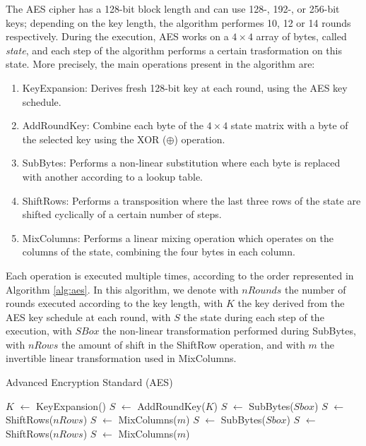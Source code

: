 \documentclass[12pt,a4paper]{book}
\theoremstyle{definition}
\begin{document}
	The AES cipher has a 128-bit block length and can use 128-, 192-, or 256-bit keys; depending on the key length, the algorithm performes 10, 12 or 14 rounds respectively. During the execution, AES works on a $4\times 4$ array of bytes, called \textit{state}, and each step of the algorithm performs a certain trasformation on this state. More precisely, the main operations present in the algorithm are:
	\begin{enumerate}
		\item \textsf{KeyExpansion}: Derives fresh 128-bit key at each round, using the AES key schedule.
		\item \textsf{AddRoundKey}: Combine each byte of the $4\times 4$ state matrix with a byte of the selected key using the XOR ($\oplus$) operation.
		\item \textsf{SubBytes}: Performs a non-linear substitution where each byte is replaced with another according to a lookup table.
		\item \textsf{ShiftRows}: Performs a transposition where the last three rows of the state are shifted cyclically of a certain number of steps.
		\item \textsf{MixColumns}: Performs a linear mixing operation which operates on the columns of the state, combining the four bytes in each column.
	\end{enumerate}
	Each operation is executed multiple times, according to the order represented in Algorithm \ref{alg:aes}. In this algorithm, we denote with $nRounds$ the number of rounds executed according to the key length, with $K$ the key derived from the AES key schedule at each round, with $S$ the state during each step of the execution, with $SBox$ the non-linear transformation performed during SubBytes, with $nRows$ the amount of shift in the ShiftRow operation, and with $m$ the invertible linear transformation used in MixColumns.
	\begin{algorithm}[H]
		\caption{Advanced Encryption Standard (AES)}
		\label{alg:aes}
		\begin{algorithmic}[1]
			\State $K$ $\leftarrow$ KeyExpansion()
			\State $S$ $\leftarrow$ AddRoundKey($K$)
			\State $S$ $\leftarrow$ SubBytes($Sbox$)
			\State $S$ $\leftarrow$ ShiftRows($nRows$)
			\State $S$ $\leftarrow$ MixColumns($m$)
			\EndFor
			\State $S$ $\leftarrow$ SubBytes($Sbox$)
			\State $S$ $\leftarrow$ ShiftRows($nRows$)
			\State $S$ $\leftarrow$ MixColumns($m$)
		\end{algorithmic}
	\end{algorithm}
	{}
	
\end{document}
